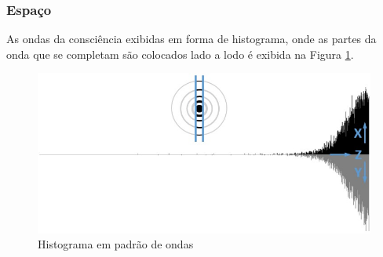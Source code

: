 \subsubsection{Espaço}
As ondas da consciência exibidas em forma de histograma, onde as partes da onda que se completam são colocados lado a lodo é exibida na Figura \ref{fig:consciousness_space_waves}. 
\begin{figure}[H]
\caption{Histograma em padrão de ondas}
\label{fig:consciousness_space_waves}
\centering
\includegraphics[scale=.7]{sections/images/consciousness_space_waves.jpg}
\end{figure}

